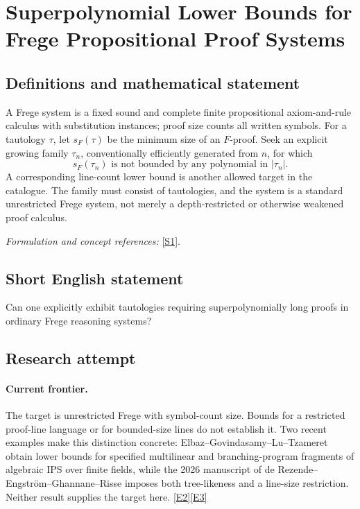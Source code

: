 \documentclass[11pt,a4paper]{article}
\newcommand{\sref}[2]{\hyperlink{source:#1:#2}{[S#2]}}
\newcommand{\eref}[2]{\hyperlink{extra:#1:#2}{[E#2]}}
\newif\ifshowcatalogue
\newcommand{\cataloguescope}[1]{\ifshowcatalogue
 \paragraph{Exact scope in the supplied catalogue.}
 \begin{quote}\small #1\end{quote}\fi}
\numberwithin{equation}{section}
\begin{document}
\setcounter{section}{0}
\clearpage
\section*{\texorpdfstring{Superpolynomial Lower Bounds for Frege Propositional Proof Systems}{Superpolynomial Lower Bounds for Frege Propositional Proof Systems}}\label{statement}
\subsection{Definitions and mathematical statement}
A Frege system is a fixed sound and complete finite propositional axiom-and-rule calculus with substitution instances; proof size counts all written symbols. For a tautology $\tau$, let $s_F(\tau)$ be the minimum size of an $F$-proof. Seek an explicit growing family $\tau_n$, conventionally efficiently generated from $n$, for which
\[
 s_F(\tau_n)\text{ is not bounded by any polynomial in }|\tau_n|.
\]
A corresponding line-count lower bound is another allowed target in the catalogue. The family must consist of tautologies, and the system is a standard unrestricted Frege system, not merely a depth-restricted or otherwise weakened proof calculus.
\par\smallskip\textit{Formulation and concept references:} \sref{statement}{1}.
\cataloguescope{Prove a superpolynomial lower bound on the size, or number of lines, of proofs in standard Frege propositional proof systems for an explicit family of propositional tautologies.}
\subsection{Short English statement}
Can one explicitly exhibit tautologies requiring superpolynomially long proofs in ordinary Frege reasoning systems?
\subsection{Research attempt}

\paragraph{Current frontier.}
The target is unrestricted Frege with symbol-count size. Bounds for a
restricted proof-line language or for bounded-size lines do not establish it.
Two recent examples make this distinction concrete: Elbaz--Govindasamy--Lu--Tzameret
obtain lower bounds for specified multilinear and branching-program fragments
of algebraic IPS over finite fields, while the 2026 manuscript of
de Rezende--Engstr\"om--Ghannane--Risse imposes both tree-likeness and a line-size
restriction. Neither result supplies the target here.
\eref{statement}{2}\eref{statement}{3}
\end{document}
